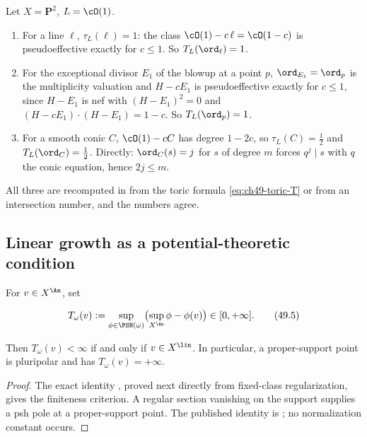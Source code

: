 \begin{example}
\label{ex:ch49-p2-divisorial}
Let $X=\mathbf P^2$, $L=\cO(1)$.
\begin{enumerate}
\item\label{itm:ch49-p2d:line}
      For a line $\ell$, $\tau_L(\ell)=1$: the class
      $\cO(1)-c\,\ell=\cO(1-c)$ is pseudoeffective exactly for $c\le1$.
      So $T_L(\ord_\ell)=1$.
\item\label{itm:ch49-p2d:point}
      For the exceptional divisor $E_1$ of the blowup at a point $p$,
      $\ord_{E_1}=\ord_p$ is the multiplicity valuation and
      $H-cE_1$ is pseudoeffective exactly for $c\le1$, since
      $H-E_1$ is nef with $(H-E_1)^2=0$ and
      $(H-cE_1)\cdot(H-E_1)=1-c$.  So $T_L(\ord_p)=1$.
\item\label{itm:ch49-p2d:conic}
      For a smooth conic $C$, $\cO(1)-cC$ has degree $1-2c$, so
      $\tau_L(C)=\tfrac12$ and $T_L(\ord_C)=\tfrac12$.  Directly:
      $\ord_C(s)=j$ for $s$ of degree $m$ forces $q^j\mid s$ with
      $q$ the conic equation, hence $2j\le m$.
\end{enumerate}
All three are recomputed in  from the toric formula
\eqref{eq:ch49-toric-T} or from an intersection number, and the numbers
agree.
\end{example}

\subsection{Linear growth as a potential-theoretic condition}
\label{sec:ch49-T-omega}

\begin{proposition}\label{prop:bj-linear-growth-potential}
For $v\in X^{\An}$, set

\[
 T_\omega(v):=
 \sup_{\phi\in\PSH(\omega)}
       \bigl(\sup_{X^{\An}}\phi-\phi(v)\bigr)\in[0,+\infty].
\tag{49.5}\label{eq:bj-T-valuation}
\]

Then $T_\omega(v)<\infty$ if and only if $v\in X^{\lin}$.  In
particular, a proper-support point is pluripolar and has
$T_\omega(v)=+\infty$.
\end{proposition}

\begin{proof}
The exact identity , proved next directly
from fixed-class regularization, gives the finiteness criterion.
A regular section vanishing on the support supplies a psh pole at a
proper-support point.  The published identity is
\cite[Lemma~4.46]{BJ22}; no normalization constant occurs.
\end{proof}

